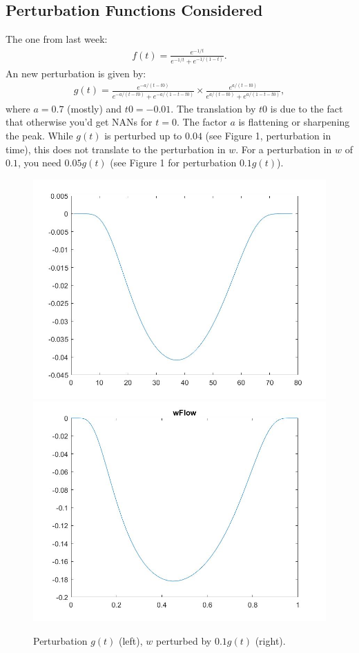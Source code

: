 \documentclass[11pt, a4paper]{article}
\theoremstyle{definition}
\begin{document}
\subsection*{Perturbation Functions Considered}
The one from last week:
\begin{align*}
f(t) = \frac{e^{-1/t}}{e^{-1/t} + e^{-1/(1-t)}}.
\end{align*}
An new perturbation is given by:
\begin{align*}
g(t) = \frac{e^{-a/(t-t0)}}{e^{-a/(t-t0)}+ e^{-a/(1-t-t0)}} \times \frac{e^{a/(t-t0)}}{e^{a/(t-t0)}+ e^{a/(1-t-t0)}},
\end{align*}
where $a=0.7$ (mostly) and $t0 = -0.01$. The translation by $t0$ is due to the fact that otherwise you'd get NANs for $t=0$. The factor $a$ is flattening or sharpening the peak. While $g(t)$ is perturbed up to $0.04$ (see Figure 1, perturbation in time), this does not translate to the perturbation in $w$. For a perturbation in $w$ of $0.1$, you need $0.05g(t)$ (see Figure 1 for perturbation $0.1g(t)$).
\begin{figure}[h]
	\includegraphics[scale=0.3]{Pertfun1.jpg}
	\includegraphics[scale=0.3]{Pertw1.jpg}
	\caption{Perturbation $g(t)$ (left), $w$ perturbed by $0.1g(t)$ (right).}
\end{figure}
\end{document}
